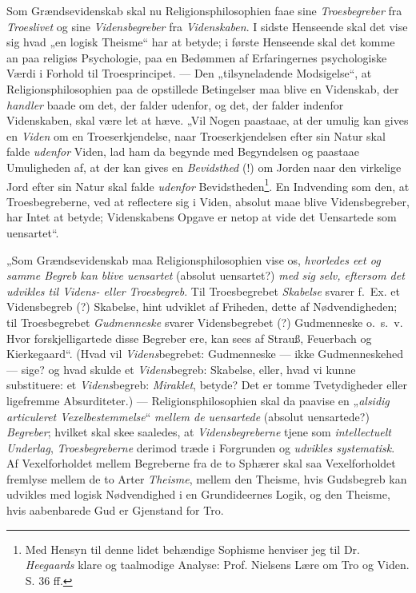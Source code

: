 \documentclass[12pt,a4paper]{book}
\newcommand{\opage}[1]{\marginnote{\footnotesize\textit{[#1]}}}
\begin{document}
Som Grændsevidenskab skal nu Religionsphilosophien faae sine \emph{Troesbegreber} fra \emph{Troeslivet} og sine \emph{Vidensbegreber} fra \emph{Videnskaben}. I sidste Henseende skal det vise sig hvad „en
logisk Theisme“ har at betyde; i første Henseende skal det komme an paa religiøs Psychologie, paa
en Bedømmen af Erfaringernes psychologiske Værdi i Forhold til Troesprincipet. --- Den
„tilsyneladende Modsigelse“, at Religionsphilosophien paa de opstillede Betingelser maa blive en
Videnskab, der \emph{handler} baade om det, der falder udenfor, og det, der falder indenfor Videnskaben,
skal være let at hæve. „Vil Nogen paastaae, at der umulig kan gives en \emph{Viden} om en Troeserkjendelse, naar Troeserkjendelsen efter sin Natur skal falde \emph{udenfor} Viden, lad ham
da begynde med Begyndelsen og paastaae Umuligheden af, at der kan gives en \emph{Bevidsthed} (!) om
Jorden naar den virkelige Jord efter sin Natur skal falde \emph{udenfor} Bevidstheden\footnote{Med
Hensyn til denne lidet behændige Sophisme henviser jeg til Dr. \emph{Heegaards} klare og taalmodige
Analyse: Prof. Nielsens Lære om Tro og Viden. S. 36 ff.}. En Indvending som den, at
\opage{207}Troesbegreberne, ved at reflectere sig i Viden, absolut maae blive Vidensbegreber, har Intet at
betyde; Videnskabens Opgave er netop at vide det Uensartede som uensartet“.

„Som Grændsevidenskab maa Religionsphilosophien vise os, \emph{hvorledes eet og samme Begreb kan blive uensartet} (absolut uensartet?) \emph{med sig selv, eftersom det udvikles til Videns- eller Troesbegreb}. Til Troesbegrebet \emph{Skabelse} svarer f.\ Ex. et Vidensbegreb (?) Skabelse, hint
udviklet af Friheden, dette af Nødvendigheden; til Troesbegrebet \emph{Gudmenneske} svarer
Vidensbegrebet (?) Gudmenneske o.\ s.\ v. Hvor forskjelligartede disse Begreber ere, kan sees af
Strauß, Feuerbach og Kierkegaard“. (Hvad vil \emph{Videns}begrebet: Gudmenneske --- ikke Gudmenneskehed
--- sige? og hvad skulde et \emph{Videns}begreb: Skabelse, eller, hvad vi kunne substituere: et
\emph{Videns}begreb: \emph{Miraklet}, betyde? Det er tomme Tvetydigheder eller ligefremme Absurditeter.)
--- Religionsphilosophien skal da paavise en „\emph{alsidig articuleret Vexelbestemmelse}“ \emph{mellem de uensartede} (absolut uensartede?) \emph{Begreber}; hvilket skal skee saaledes, at \emph{Vidensbegreberne} tjene som \emph{intellectuelt Underlag}, \emph{Troesbegreberne} derimod træde i Forgrunden og \emph{udvikles systematisk}. Af Vexelforholdet mellem Begreberne fra de to Sphærer skal saa
Vexelforholdet fremlyse mellem de to Arter \emph{Theisme}, mellem den Theisme, hvis Gudsbegreb kan
udvikles med logisk Nødvendighed i en Grundideernes Logik, og den Theisme, hvis aabenbarede Gud er
Gjenstand for Tro.
\end{document}
